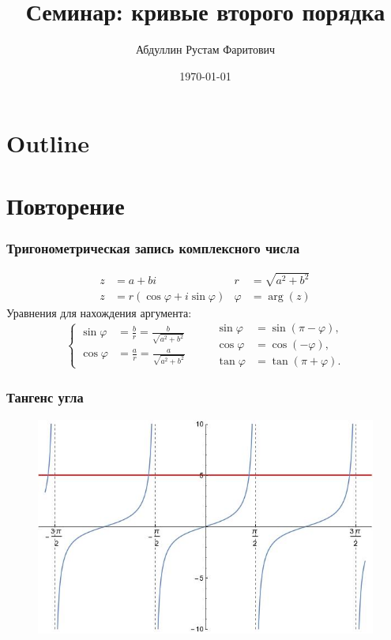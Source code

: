 \documentclass[10pt]{beamer}
\title[]{Семинар: кривые второго порядка}
\author[]{Абдуллин Рустам Фаритович}
\institute[НГУ]
{
    \vspace{0.5cm}
    \begin{minipage}{0.6\linewidth}
        \begin{center}
            \scriptsize
            \textbf{ НОВОСИБИРСКИЙ ГОСУДАРСТВЕННЫЙ УНИВЕРСИТЕТ, НГУ}
        \end{center}
    \end{minipage}
}
\date{\today}
\begin{document}
    \begin{frame}
        \titlepage
    \end{frame}

    \section*{Outline}
    \begin{frame}
        \tableofcontents
    \end{frame}

    \section{Повторение}
    \begin{frame}
        \frametitle{Тригонометрическая запись комплексного числа}
        \begin{align*}
            z & = a + b i & r & = \sqrt{a^2 + b^2} \\
            z & = r(\cos \varphi + i \sin \varphi) & \varphi & = \operatorname{arg}(z)
        \end{align*}
        Уравнения для нахождения аргумента:
        \begin{equation*}
            \left\{
                \begin{aligned}
                    \sin \varphi &= \frac{b}{r} = \frac{b}{\sqrt{a^2 + b^2}} \\
                    \cos \varphi &= \frac{a}{r} = \frac{a}{\sqrt{a^2 + b^2}}
                \end{aligned}
            \right.
            \qquad
            \begin{aligned}
                \sin \varphi & = \sin (\pi - \varphi), \\
                \cos \varphi & = \cos (-\varphi), \\
                \tan \varphi & = \tan (\pi + \varphi).
            \end{aligned}
        \end{equation*}
    \end{frame}

    \begin{frame}
        \frametitle{Тангенс угла}
        \begin{figure}
            \includegraphics[width=\textwidth]{tangent.jpg}
        \end{figure}
    \end{frame}
\end{document}
